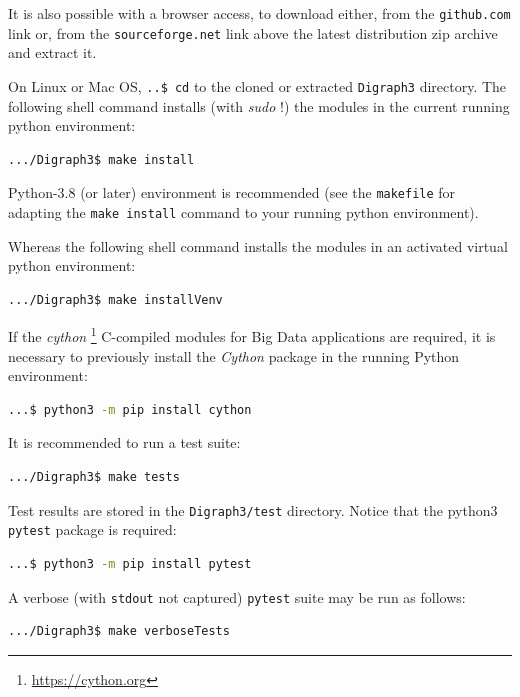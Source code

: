 It is also possible with a browser access, to download either, from the \texttt{github.com} link or, from the \texttt{sourceforge.net} link above the latest distribution zip archive and extract it.

On Linux or Mac OS, \texttt{..\$ cd} to the cloned or extracted \texttt{Digraph3} directory. The following shell command installs (with \emph{sudo} !) the \Digraph modules in the current running python environment:
\begin{lstlisting}[language=sh, backgroundcolor=\color{White},numbers=none]
  .../Digraph3$ make install
\end{lstlisting}

Python-3.8 (or later) environment is recommended (see the \texttt{makefile} for adapting the \texttt{make install} command to your running python environment).

Whereas the following shell command installs the \Digraph modules in an activated virtual python environment:
\begin{lstlisting}[language=sh, backgroundcolor=\color{White}, numbers=none]
  .../Digraph3$ make installVenv
\end{lstlisting}


If the \emph{cython} \footnote{\href{https://cython.org}{https://cython.org}} C-compiled modules for Big Data applications are required, it is necessary to previously install the \emph{Cython} package in the running Python environment:
\begin{lstlisting}[language=sh, backgroundcolor=\color{White}, numbers=none]
  ...$ python3 -m pip install cython
\end{lstlisting}

It is recommended to run a test suite:
\begin{lstlisting}[language=sh, backgroundcolor=\color{White}, numbers=none]
  .../Digraph3$ make tests
\end{lstlisting}

Test results are stored in the \texttt{Digraph3/test} directory. Notice that the python3 \texttt{pytest} package is required:
\begin{lstlisting}[language=sh, backgroundcolor=\color{White}, numbers=none]
  ...$ python3 -m pip install pytest
\end{lstlisting}

A verbose (with \texttt{stdout} not captured) \texttt{pytest} suite may be run as follows:
\begin{lstlisting}[language=sh, backgroundcolor=\color{White}, numbers=none]
  .../Digraph3$ make verboseTests
\end{lstlisting}

